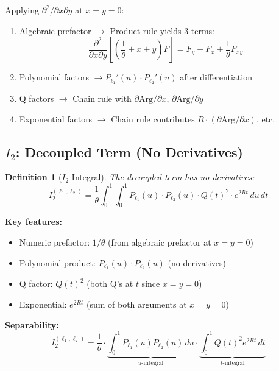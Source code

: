 \documentclass[11pt]{article}
\newtheorem{definition}{Definition}
\begin{document}
Applying $\partial^2/\partial x \partial y$ at $x = y = 0$:
\begin{enumerate}
\item Algebraic prefactor $\to$ Product rule yields 3 terms:
  \begin{equation}
  \frac{\partial^2}{\partial x \partial y}\left[\left(\frac{1}{\theta} + x + y\right) F\right] = F_y + F_x + \frac{1}{\theta} F_{xy}
  \end{equation}
\item Polynomial factors $\to P_{\ell_1}'(u) \cdot P_{\ell_2}'(u)$ after differentiation
\item Q factors $\to$ Chain rule with $\partial \text{Arg}/\partial x$, $\partial \text{Arg}/\partial y$
\item Exponential factors $\to$ Chain rule contributes $R \cdot (\partial \text{Arg}/\partial x)$, etc.
\end{enumerate}

\subsection{$I_2$: Decoupled Term (No Derivatives)}

\begin{definition}[$I_2$ Integral]
The decoupled term has no derivatives:
\begin{equation}
\boxed{
I_2^{(\ell_1,\ell_2)} = \frac{1}{\theta} \int_0^1 \int_0^1 P_{\ell_1}(u) \cdot P_{\ell_2}(u) \cdot Q(t)^2 \cdot e^{2Rt} \, du\, dt
}
\end{equation}
\end{definition}

\textbf{Key features:}
\begin{itemize}
\item Numeric prefactor: $1/\theta$ (from algebraic prefactor at $x=y=0$)
\item Polynomial product: $P_{\ell_1}(u) \cdot P_{\ell_2}(u)$ (no derivatives)
\item Q factor: $Q(t)^2$ (both Q's at $t$ since $x=y=0$)
\item Exponential: $e^{2Rt}$ (sum of both arguments at $x=y=0$)
\end{itemize}

\textbf{Separability:}
\begin{equation}
I_2^{(\ell_1,\ell_2)} = \frac{1}{\theta} \cdot \underbrace{\int_0^1 P_{\ell_1}(u) P_{\ell_2}(u) \, du}_{\text{$u$-integral}} \cdot \underbrace{\int_0^1 Q(t)^2 e^{2Rt} \, dt}_{\text{$t$-integral}}
\end{equation}
\end{document}
